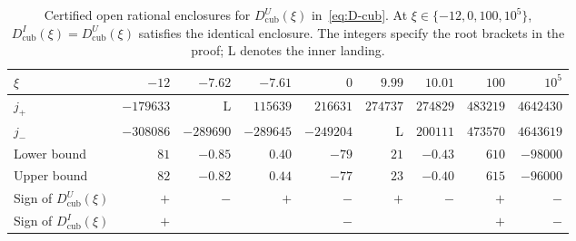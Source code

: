 \begin{table}[ht]
\centering\scriptsize\setlength{\tabcolsep}{3.5pt}
\caption{Certified open rational enclosures for $D_{\mathrm{cub}}^U(\xi)$ in~\eqref{eq:D-cub}. At $\xi\in\{-12,0,100,10^5\}$, $D_{\mathrm{cub}}^I(\xi)=D_{\mathrm{cub}}^U(\xi)$ satisfies the identical enclosure. The integers specify the root brackets in the proof; L denotes the inner landing.}\label{tab:cubic}
\smallskip
\begin{tabular}{@{}lrrrrrrrr@{}}
\toprule
$\xi$ & $-12$ & $-7.62$ & $-7.61$ & $0$ & $9.99$ & $10.01$ & $100$ & $10^5$ \\
\midrule
$j_+$ & $-179633$ & L & $115639$ & $216631$ & $274737$ & $274829$ & $483219$ & $4642430$ \\
$j_-$ & $-308086$ & $-289690$ & $-289645$ & $-249204$ & L & $200111$ & $473570$ & $4643619$ \\
Lower bound & $81$ & $-0.85$ & $0.40$ & $-79$ & $21$ & $-0.43$ & $610$ & $-98000$ \\
Upper bound & $82$ & $-0.82$ & $0.44$ & $-77$ & $23$ & $-0.40$ & $615$ & $-96000$ \\
Sign of $D_{\mathrm{cub}}^U(\xi)$ & $+$ & $-$ & $+$ & $-$ & $+$ & $-$ & $+$ & $-$ \\
Sign of $D_{\mathrm{cub}}^I(\xi)$ & $+$ &  &  & $-$ &  &  & $+$ & $-$ \\
\bottomrule
\end{tabular}
\end{table}
